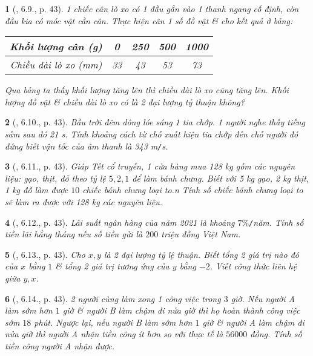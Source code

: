 \documentclass{article}
\newtheorem{baitoan}{}
\begin{document}
\begin{baitoan}[\cite{Binh_boi_duong_Toan_7_tap_1}, 6.9., p. 43]
	1 chiếc cân lò xo có 1 đầu gắn vào 1 thanh ngang cố định, còn đầu kia có móc vật cần cân. Thực hiện cân 1 số đồ vật \& cho kết quả ở bảng:
	\begin{table}[H]
		\centering
		\begin{tabular}{|c|c|c|c|c|}
			\hline
			Khối lượng cân (g) & 0 & 250 & 500 & 1000 \\
			\hline
			Chiều dài lò xo (mm) & 33 & 43 & 53 & 73 \\
			\hline
		\end{tabular}
	\end{table}
	\noindent Qua bảng ta thấy khối lượng tăng lên thì chiều dài lò xo cũng tăng lên. Khối lượng đồ vật \& chiều dài lò xo có là 2 đại lượng tỷ thuận không?
\end{baitoan}

\begin{baitoan}[\cite{Binh_boi_duong_Toan_7_tap_1}, 6.10., p. 43]
	Bầu trời đêm dông lóe sáng 1 tia chớp. 1 người nghe thấy tiếng sấm sau đó {\rm21 s}. Tính khoảng cách từ chỗ xuất hiện tia chớp đến chỗ người đó đứng biết vận tốc của âm thanh là {\rm343 m{\tt/}s}.
\end{baitoan}

\begin{baitoan}[\cite{Binh_boi_duong_Toan_7_tap_1}, 6.11., p. 43]
	Giáp Tết cổ truyền, 1 cửa hàng mua {\rm128 kg} gồm các nguyên liệu: gạo, thịt, đỗ theo tỷ lệ $5,2,1$ để làm bánh chưng. Biết với {\rm5 kg} gạo, {\rm2 kg} thịt, {\rm1 kg} đỗ làm được $10$ chiếc bánh chưng loại to.n Tính số chiếc bánh chưng loại to sẽ làm ra được với {\rm128 kg} các nguyên liệu.
\end{baitoan}

\begin{baitoan}[\cite{Binh_boi_duong_Toan_7_tap_1}, 6.12., p. 43]
	Lãi suất ngân hàng của năm 2021 là khoảng $7\%${\tt/}năm. Tính số tiền lãi hằng tháng nếu số tiền gửi là $200$ triệu đồng Việt Nam.
\end{baitoan}

\begin{baitoan}[\cite{Binh_boi_duong_Toan_7_tap_1}, 6.13., p. 43]
	Cho $x,y$ là 2 đại lượng tỷ lệ thuận. Biết tổng 2 giá trị nào đó của $x$ bằng $1$ \& tổng 2 giá trị tương ứng của $y$ bằng $-2$. Viết công thức liên hệ giữa $y,x$.
\end{baitoan}

\begin{baitoan}[\cite{Binh_boi_duong_Toan_7_tap_1}, 6.14., p. 43]
	2 người cùng làm xong 1 công việc trong $3$ giờ. Nếu người A làm sớm hơn $1$ giờ \& người B làm chậm đi nửa giờ thì họ hoàn thành công việc sớm $18$ phút. Ngược lại, nếu người B làm sớm hơn $1$ giờ \& người A làm chậm đi nửa giờ thì người A nhận tiền công ít hơn so với thực tế là $56000$ đồng. Tính số tiền công người A nhận được.
\end{baitoan}
\end{document}
